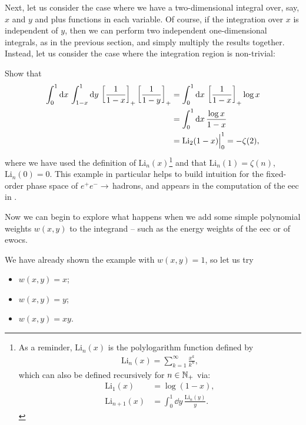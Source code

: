 \begin{subappendices}
Next, let us consider the case where we have a two-dimensional integral over, say, \(x\) and \(y\) and plus functions in each variable.
%
Of course, if the integration over \(x\) is independent of \(y\), then we can perform two independent one-dimensional integrals, as in the previous section, and simply multiply the results together.
%
Instead, let us consider the case where the integration region is non-trivial:

\begin{exercise}

    Show that
    \begin{align}
        \int_{0}^{1} \dd x\,
        \int_{1-x}^{1} \dd y\,
        \le[\frac{1}{1-x}\ri]_+
        \le[\frac{1}{1-y}\ri]_+
        &=
        \int_{0}^{1} \dd x\,
        \le[\frac{1}{1-x}\ri]_+
        \log x
        \label{eq:simple_2d}
        \\
        &=
        \int_{0}^{1} \dd x\,
        \frac{\log x}{1-x}
        \notag
        \\
        &= \text{Li}_2(1-x)\Big|^1_0 = -\zeta(2)
        \label{eq:simple_2d_soln}
        ,
    \end{align}
    where we have used the definition of \(\text{Li}_n(x)\)\footnote{
        As a reminder, \(\text{Li}_n(x)\) is the polylogarithm function defined by
        \begin{align}
            \text{Li}_n(x) = \sum_{k=1}^\infty \frac{x^k}{k^n}
            ,
        \end{align}
        which can also be defined recursively for \(n \in \mathbb N_+\) via:
        \begin{align}
            \text{Li}_1(x) &= \log(1-x)
            ,
            \\
            \text{Li}_{n+1}(x) &= \int_0^1 \dd y\, \frac{\text{Li}_n(y)}{y}
            .
        \end{align}
    } and that \(\text{Li}_n(1) = \zeta(n)\), \(\text{Li}_n(0) = 0\).
    This example in particular helps to build intuition for the fixed-order phase space of \(e^+e^-\to\,\)hadrons, and appears in the computation of the \gls{eec} in .
\end{exercise}


Now we can begin to explore what happens when we add some simple polynomial weights \(w(x,y)\) to the integrand -- such as the energy weights of the \gls{eec} or of \glspl{ewoc}.

\begin{example}
We have already shown the example with \(w(x,y) = 1\), so let us try
\begin{itemize}
    \item
        \(w(x,y) = x\);
    \item
        \(w(x,y) = y\);
    \item
        \(w(x,y) = x y\).
\end{itemize}


\end{example}
\end{subappendices}

